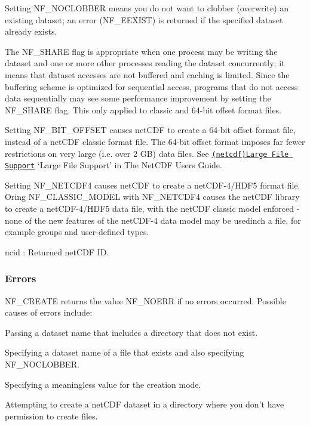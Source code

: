 Setting N\+F\+\_\+\+N\+O\+C\+L\+O\+B\+B\+ER means you do not want to clobber (overwrite) an existing dataset; an error (N\+F\+\_\+\+E\+E\+X\+I\+ST) is returned if the specified dataset already exists.

The N\+F\+\_\+\+S\+H\+A\+RE flag is appropriate when one process may be writing the dataset and one or more other processes reading the dataset concurrently; it means that dataset accesses are not buffered and caching is limited. Since the buffering scheme is optimized for sequential access, programs that do not access data sequentially may see some performance improvement by setting the N\+F\+\_\+\+S\+H\+A\+RE flag. This only applied to classic and 64-\/bit offset format files.

Setting N\+F\+\_\+B\+I\+T\+\_\+\+O\+F\+F\+S\+ET causes net\+C\+DF to create a 64-\/bit offset format file, instead of a net\+C\+DF classic format file. The 64-\/bit offset format imposes far fewer restrictions on very large (i.\+e. over 2 GB) data files. See \href{netcdf.html#Large-File-Support}{\tt (netcdf)Large File Support} ‘\+Large File Support’ in The Net\+C\+DF Users Guide.

Setting N\+F\+\_\+\+N\+E\+T\+C\+D\+F4 causes net\+C\+DF to create a net\+C\+D\+F-\/4/\+H\+D\+F5 format file. Oring N\+F\+\_\+\+C\+L\+A\+S\+S\+I\+C\+\_\+\+M\+O\+D\+EL with N\+F\+\_\+\+N\+E\+T\+C\+D\+F4 causes the net\+C\+DF library to create a net\+C\+D\+F-\/4/\+H\+D\+F5 data file, with the net\+C\+DF classic model enforced -\/ none of the new features of the net\+C\+D\+F-\/4 data model may be usedinch a file, for example groups and user-\/defined types.

{\ttfamily ncid} \+: Returned net\+C\+DF ID.

\subsubsection*{Errors}

N\+F\+\_\+\+C\+R\+E\+A\+TE returns the value N\+F\+\_\+\+N\+O\+E\+RR if no errors occurred. Possible causes of errors include\+:


\begin{DoxyItemize}
\item Passing a dataset name that includes a directory that does not exist.
\item Specifying a dataset name of a file that exists and also specifying N\+F\+\_\+\+N\+O\+C\+L\+O\+B\+B\+ER.
\item Specifying a meaningless value for the creation mode.
\item Attempting to create a net\+C\+DF dataset in a directory where you don’t have permission to create files.
\end{DoxyItemize}

